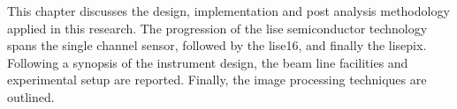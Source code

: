 \documentclass[../../main.tex]{subfiles}
\begin{document}
%
    \Xsection%
    This chapter discusses the design, implementation and post analysis methodology applied in this research.
    The progression of the \gls{lise} semiconductor technology spans the single channel sensor, followed by the \gls{lise16}, and finally the \gls{lisepix}. 
    Following a synopsis of the instrument design, the beam line facilities and experimental setup are reported.
    Finally, the image processing techniques are outlined.
\end{document}
